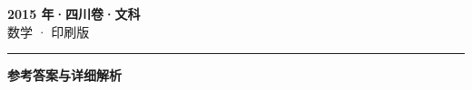 \documentclass[zihao=5, a4paper]{ctexart}
\begin{document}
\begin{center}
  {\Large\bfseries 2015 年·四川卷·文科}\\[4pt]
  {\large 数学 · 印刷版}
\end{center}
\medskip
{}

\par\bigskip\hrule\bigskip
{}
\begin{center}{\large\bfseries 参考答案与详细解析}\end{center}
\smallskip

\end{document}
